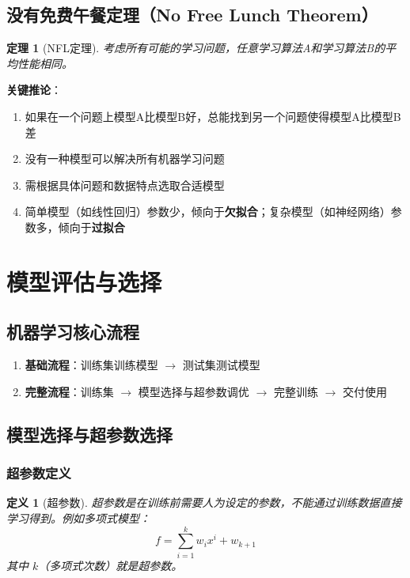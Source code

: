 \documentclass[12pt,a4paper]{ctexart}
\newtheorem{definition}{定义}[section]
\newtheorem{theorem}{定理}[section]
\begin{document}
\subsection{没有免费午餐定理（No Free Lunch Theorem）}

\begin{theorem}[NFL定理]
考虑所有可能的学习问题，任意学习算法A和学习算法B的平均性能相同。
\end{theorem}

\textbf{关键推论}：
\begin{enumerate}
    \item 如果在一个问题上模型A比模型B好，总能找到另一个问题使得模型A比模型B差
    \item 没有一种模型可以解决所有机器学习问题
    \item 需根据具体问题和数据特点选取合适模型
    \item 简单模型（如线性回归）参数少，倾向于\textbf{欠拟合}；复杂模型（如神经网络）参数多，倾向于\textbf{过拟合}
\end{enumerate}

\section{模型评估与选择}

\subsection{机器学习核心流程}

\begin{enumerate}
    \item \textbf{基础流程}：训练集训练模型 $\to$ 测试集测试模型
    \item \textbf{完整流程}：训练集 $\to$ 模型选择与超参数调优 $\to$ 完整训练 $\to$ 交付使用
\end{enumerate}

\subsection{模型选择与超参数选择}

\subsubsection{超参数定义}

\begin{definition}[超参数]
超参数是在训练前需要人为设定的参数，不能通过训练数据直接学习得到。例如多项式模型：
\[
f = \sum_{i=1}^{k} w_i x^i + w_{k+1}
\]
其中 $k$（多项式次数）就是超参数。
\end{definition}
\end{document}
